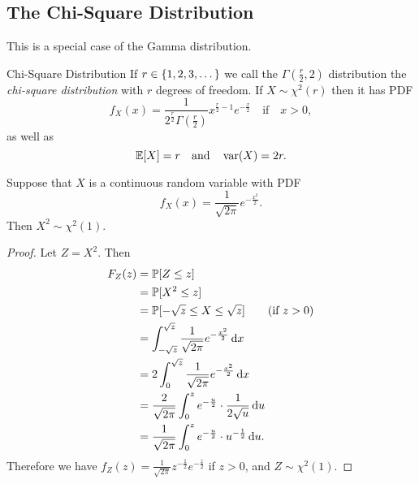 \documentclass[class=article, crop=false]{standalone}
\begin{document}
  \subsection{The Chi-Square Distribution}
  This is a special case of the Gamma distribution.
  \begin{definition}{Chi-Square Distribution}
    If $r\in \set{1,2,3,\dotsc}$ we call the $\Gamma(\frac{r}{2}, 2)$ distribution the \emph{chi-square distribution} with $r$ degrees of freedom. If $X\sim \chi^2(r)$ then it has PDF
    \[
      f_X(x) = \frac{1}{2^{\frac{r}{2}}\Gamma(\frac{r}{2})}x^{\frac{r}{2} - 1}e^{-\frac{x}{2}}\quad\text{if}\quad x > 0,
    \]
    as well as
    \[
      \E[X] = r\quad\text{and}\quad \var(X) = 2r.
    \]
  \end{definition}
  \begin{example}{}
    Suppose that $X$ is a continuous random variable with PDF
    \[
      f_X(x) = \frac{1}{\sqrt{2\pi}}e^{-\frac{x^2}{2}}.
    \]
    Then $X^2\sim \chi^2(1)$.
    \begin{proof}
      Let $Z = X^2$. Then
      \begin{align*}
        F_Z(z) &= \P[Z \leq z] \\
               &= \P[X^2 \leq z] \\
               &= \P[-\sqrt{z} \leq X \leq\sqrt{z}] \tag{if $z > 0$} \\
               &= \int_{-\sqrt{z}}^{\sqrt{z}}\frac{1}{\sqrt{2\pi}}e^{-\frac{x^2}{2}} \,\mathrm dx \\
               &= 2\int_{0}^{\sqrt{z}}\frac{1}{\sqrt{2\pi}}e^{-\frac{x^2}{2}} \,\mathrm dx \\
               &= \frac{2}{\sqrt{2\pi}} \int_{0}^{z}e^{-\frac{u}{2}}\cdot \frac{1}{2\sqrt{u}} \,\mathrm du \\
               &= \frac{1}{\sqrt{2\pi}} \int_{0}^{z}e^{-\frac{u}{2}}\cdot u^{-\frac{1}{2}} \,\mathrm du.
      \end{align*}
      Therefore we have $f_Z(z) = \frac{1}{\sqrt{2 \pi}}z^{-\frac{1}{2}}e^{-\frac{z}{2}}$ if $z > 0$, and $Z\sim \chi^2(1)$.
    \end{proof}
  \end{example}
\end{document}
